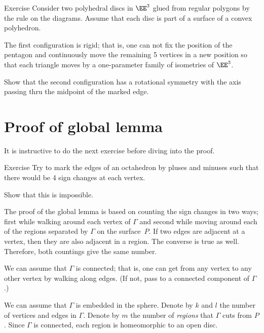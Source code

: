 \begin{thm}{Exercise}\label{ex:disc-bend}
Consider two polyhedral discs in $\EE^3$ glued from regular polygons by the rule on the diagrams.
Assume that each disc is part of a surface of a convex polyhedron.

\begin{subthm}{}
The first configuration is rigid; that is, one can not fix the position of the pentagon and continuously move the remaining 5 vertices in a new position so that each triangle moves by a one-parameter family of isometries of $\EE^3$.
\end{subthm}

\begin{subthm}{}
Show that the second configuration has a rotational symmetry with the axis passing thru the midpoint of the marked edge.
\end{subthm}

\end{thm}

\section{Proof of global lemma}

It is instructive to do the next exercise before diving into the proof.

\begin{thm}{Exercise}\label{ex:octahedron}
Try to mark the edges of an octahedron
by pluses and minuses
such that there would be 4 sign changes at each vertex.

Show that this is impossible.
\end{thm}

The proof of the global lemma is based on counting the sign changes
in two ways;
first while walking around each vertex of $\Gamma$
and second while moving around each of the regions separated by $\Gamma$
on the surface~$P$.
If two edges are adjacent at a vertex,
then they are also adjacent in a region.
The converse is true as well.
Therefore, both countings give the same number.

We can assume that $\Gamma$ is connected;
that is, one can get from any vertex to any other vertex by walking along edges.
(If not, pass to a connected component of $\Gamma$.)

We can assume that $\Gamma$ is embedded in the sphere.
Denote by $k$ and $l$ the number of vertices and edges in $\Gamma$.
Denote by $m$ the number of \textit{regions} that $\Gamma$ cuts from $P$.
Since $\Gamma$ is connected, each region is homeomorphic to an open disc.

